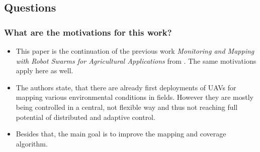 \subsection*{Questions}
\subsubsection*{What are the motivations for this work?}
\begin{itemize}
    \item This paper is the continuation of the previous work \emph{Monitoring  and  Mapping with  Robot  Swarms  for  Agricultural  Applications} from \cite{Albani2017}. The same motivations apply here as well.
    \item The authors state, that there are already first deployments of UAVs for mapping various environmental conditions in fields. However they are mostly being controlled in a central, not flexible way and thus not reaching full potential of distributed and adaptive control.
    \item Besides that, the main goal is to improve the mapping and coverage algorithm.
\end{itemize}

